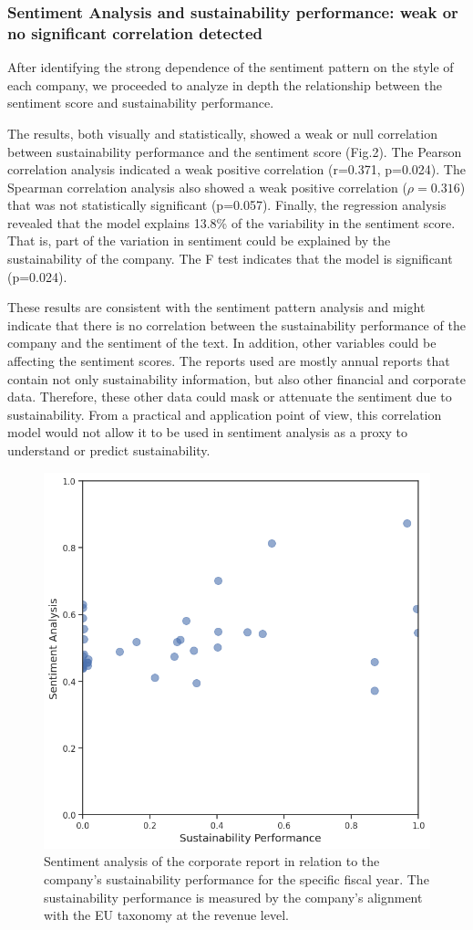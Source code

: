 \documentclass[times]{oupau}
\begin{document}
\subsubsection{Sentiment Analysis and sustainability performance: weak or no significant correlation detected}
After identifying the strong dependence of the sentiment pattern on the style of each company, we proceeded to analyze in depth the relationship between the sentiment score and sustainability performance.
\par
\justify

The results, both visually and statistically, showed a weak or null correlation between sustainability performance and the sentiment score (Fig.2). The Pearson correlation analysis indicated a weak positive correlation (r=0.371, p=0.024). The Spearman correlation analysis also showed a weak positive correlation ($\rho = 0.316$) that was not statistically significant (p=0.057). Finally, the regression analysis revealed that the model explains 13.8\% of the variability in the sentiment score. That is, part of the variation in sentiment could be explained by the sustainability of the company. The F test indicates that the model is significant (p=0.024).
\par
\justify

These results are consistent with the sentiment pattern analysis and might indicate that there is no correlation between the sustainability performance of the company and the sentiment of the text. In addition, other variables could be affecting the sentiment scores. The reports used are mostly annual reports that contain not only sustainability information, but also other financial and corporate data. Therefore, these other data could mask or attenuate the sentiment due to sustainability. From a practical and application point of view, this correlation model would not allow it to be used in sentiment analysis as a proxy to understand or predict sustainability.

\begin{figure}
    \centering
    \includegraphics[width=0.5\linewidth]{corr_revenue.png}
    \caption{Sentiment analysis of the corporate report in relation to the company's sustainability performance for the specific fiscal year. The sustainability performance is measured by the company's alignment with the EU taxonomy at the revenue level.}
    \label{fig:enter-label}
\end{figure}
\end{document}
